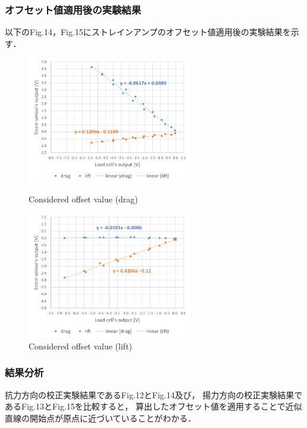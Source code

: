 \documentclass[twocolumn,a4j]{jsarticle}
\begin{document}
\subsubsection*{オフセット値適用後の実験結果}
以下のFig.14，Fig.15にストレインアンプのオフセット値適用後の実験結果を示す．\\
\begin{figure}[htbp]
    \footnotesize
    \begin{center}
        \includegraphics[width=72mm]{../images/calibration_2_drag_offset.png}
        \caption{Considered offset value (drag)}
        \includegraphics[width=72mm]{../images/calibration_2_lift_offset.png}
        \caption{Considered offset value (lift)}
    \end{center}
\end{figure}

\subsubsection*{結果分析}

抗力方向の校正実験結果であるFig.12とFig.14及び，
揚力方向の校正実験結果であるFig.13とFig.15を比較すると，
算出したオフセット値を適用することで近似直線の開始点が原点に近づいていることがわかる．

\newpage
\end{document}
